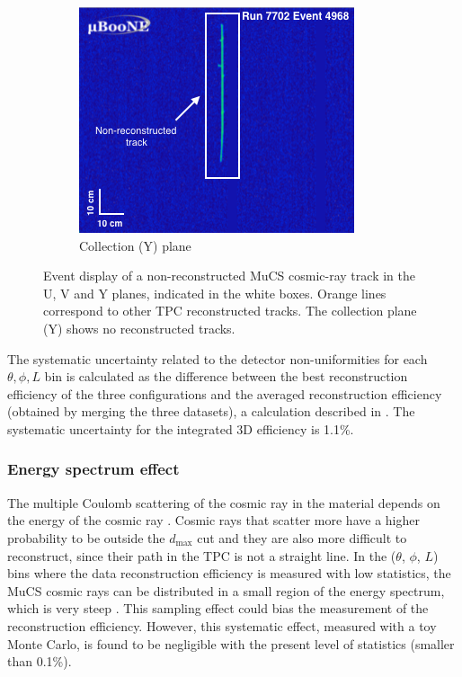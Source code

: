 \documentclass[a4paper,11pt]{article}
\begin{document}
\begin{figure}[htbp]
\begin{center}
    \begin{subfigure}{0.3\textwidth}
      \includegraphics[width=\linewidth]{figures/y.png}
      \caption{Collection (Y) plane} \label{fig:y}
    \end{subfigure}    \caption{Event display of a non-reconstructed MuCS cosmic-ray track in the U, V and Y planes, indicated in the white boxes. Orange lines correspond to other TPC reconstructed tracks. The collection plane (Y) shows no reconstructed tracks.} \label{fig:example}
  \end{center}
\end{figure}

The systematic uncertainty related to the detector non-uniformities for each $\theta,\phi,L$ bin is calculated as the difference between the best reconstruction efficiency of the three configurations and the averaged reconstruction efficiency (obtained by merging the three datasets), a calculation described in \cite{besiii}. The systematic uncertainty for the integrated 3D efficiency is 1.1\%.

\subsubsection{Energy spectrum effect}
The multiple Coulomb scattering of the cosmic ray in the material depends on the energy of the cosmic ray \cite{pdg}. Cosmic rays that scatter more have a higher probability to be outside the $d_{\mathrm{max}}$ cut and they are also more difficult to reconstruct, since their path in the TPC is not a straight line. In the ($\theta$, $\phi$, $L$) bins where the data reconstruction efficiency is measured with low statistics, the MuCS cosmic rays can be distributed in a small region of the energy spectrum, which is very steep \cite{corsika}. This sampling effect could bias the measurement of the reconstruction efficiency. However, this systematic effect, measured with a toy Monte Carlo, is found to be negligible with the present level of statistics (smaller than 0.1\%).
\end{document}
